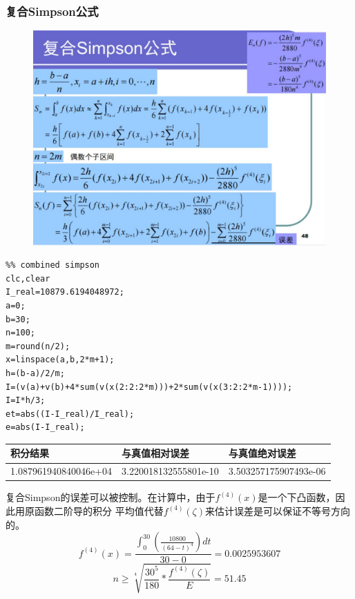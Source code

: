 \documentclass[a4paper,12pt]{ctexart}
\begin{document}
\subsubsection{复合Simpson公式}
\begin{figure}[H]
    \centering
    \includegraphics[width=14cm]{第五章作业/fusimpson.jpg}
\end{figure}
\begin{lstlisting}
%% combined simpson
clc,clear
I_real=10879.6194048972;
a=0;
b=30;
n=100;
m=round(n/2);
x=linspace(a,b,2*m+1);
h=(b-a)/2/m;
I=(v(a)+v(b)+4*sum(v(x(2:2:2*m)))+2*sum(v(x(3:2:2*m-1)))); 
I=I*h/3;
et=abs((I-I_real)/I_real);
e=abs(I-I_real);
\end{lstlisting}
\begin{table}[H]
    \centering
    \begin{tabular}{lll}
        \hline
        积分结果              & 与真值相对误差        & 与真值绝对误差        \\ \hline
        1.087961940840046e+04 & 3.220018132555801e-10 & 3.503257175907493e-06 \\ \hline
    \end{tabular}
\end{table}
\par
复合Simpson的误差可以被控制。在计算中，由于$f^{(4)}(x)$是一个下凸函数，因此用原函数二阶导的积分
平均值代替$f^{(4)}(\zeta)$来估计误差是可以保证不等号方向的。
\begin{equation}
    f^{(4)}(x)=\frac{\int_{0}^{30}(\frac{10800}{(64-t)^4})dt}{30-0}=0.0025953607
\end{equation}
\begin{equation}
    n\geq \sqrt[4]{\frac{30^5}{180}*\frac{f^{(4)}(\zeta)}{E}}=51.45
\end{equation}
\end{document}
